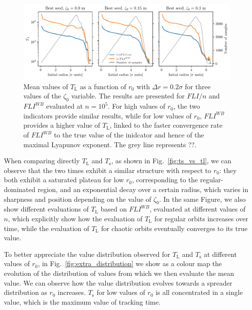 \begin{figure}
    \centering
    \includegraphics[width=1\textwidth]{6_lhc_dynamic_indicators/figs/lyapunov_time_vs_lyapunov_wb_time.pdf}
    \caption{Mean values of $T_\mathrm{L}$ as a function of $r_0$ with $\Delta r = 0.2\sigma$ for three values of the $\zeta_0$ variable. The results are presented for $FLI/n$ and $FLI^{{WB}}$ evaluated at $n=10^5$. For high values of $r_0$, the two indicators provide similar results, while for low values of $r_0$, $FLI^{{WB}}$ provides a higher value of $T_\mathrm{L}$, linked to the faster convergence rate of $FLI^{{WB}}$ to the true value of the inidcator and hence of the maximal Lyapunov exponent. The grey line represents ??.}
    \label{fig:lyapunov_time_fli_vs_wb}
\end{figure}

When comparing directly $T_\mathrm{L}$ and $T_\mathrm{s}$, as shown in Fig.~\ref{fig:ts_vs_tl}, we can observe that the two times exhibit a similar structure with respect to $r_0$: they both exhibit a saturated plateau for low $r_0$, corresponding to the regular-dominated region, and an exponential decay over a certain radius, which varies in sharpness and position depending on the value of $\zeta_0$. In the same Figure, we also show different evaluations of $T_\mathrm{L}$ based on $FLI^{WB}$, evaluated at different values of $n$, which explicitly show how the evaluation of $T_\mathrm{L}$ for regular orbits increases over time, while the evaluation of $T_\mathrm{L}$ for chaotic orbits eventually converges to its true value.

To better appreciate the value distribution observed for $T_\mathrm{L}$ and $T_\mathrm{s}$ at different values of $r_0$, in Fig.~\ref{fig:extra_distribution} we show as a colour map the evolution of the distribution of values from which we then evaluate the mean value. We can observe how the value distribution evolves towards a spreader distribution as $r_0$ increases. $T_\mathrm{s}$ for low values of $r_0$ is all concentrated in a single value, which is the maximum value of tracking time.   

